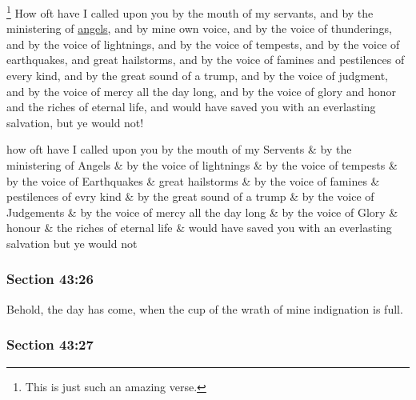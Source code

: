 			\footnote{%
				This is just such an amazing verse.
				}%
		How oft have I called upon you by the mouth of my servants, and by the ministering of \hyperref[ANGEL]{angels}, and by mine own voice, and by the voice of thunderings, and by the voice of lightnings, and by the voice of tempests, and by the voice of earthquakes, and great hailstorms, and by the voice of famines and pestilences of every kind, and by the great sound of a trump, and by the voice of judgment, and by the voice of mercy all the day long, and by the voice of glory and honor and the riches of eternal life, and would have saved you with an everlasting salvation, but ye would not!

		\begin{framed}
		\scriptsize
			\begin{compactdesc}
				\item[JSP] how oft have I called upon you by the mouth of my Servents \& by the ministering of Angels \& by the voice of lightnings \& by the voice of tempests \& by the voice of Earthquakes \& great hailstorms \& by the voice of famines \& pestilences of evry kind \& by the great sound of a trump \& by the voice of Judgements \& by the voice of mercy all the day long \& by the voice of Glory \& honour \& the riches of eternal life \& would have saved you with an everlasting salvation but ye would not
			\end{compactdesc}
		\end{framed}

	\subsubsection{Section 43:26} %
		\label{DC43-26}

		Behold, the day has come, when the cup of the wrath of mine indignation is full.


	\subsubsection{Section 43:27} %
		\label{DC43-27}

